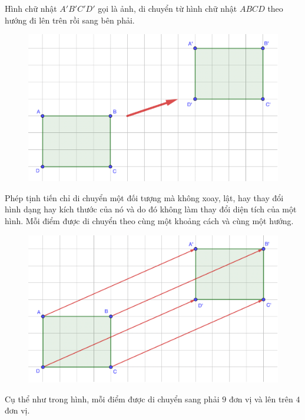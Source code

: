 \begin{multicols}{2}
	\vskip 0.1cm  
	Hình chữ nhật $A'B'C'D'$ gọi là ảnh, di chuyển từ hình chữ nhật $ABCD$ theo hướng đi lên trên rồi sang bên phải. 
	\begin{figure}[H]
		\vspace*{-5pt}
		\centering
		\captionsetup{labelformat= empty, justification=centering}
		\includegraphics[width= 1\linewidth]{Picture30}
		\vspace*{-10pt}
	\end{figure}
	Phép tịnh tiến chỉ di chuyển một đối tượng mà không xoay, lật, hay thay đổi hình dạng hay kích thước của nó và do đó không làm thay đổi diện tích của một hình. Mỗi điểm được di chuyển theo cùng một khoảng cách và cùng một hướng. 
	\begin{figure}[H]
		\vspace*{-5pt}
		\centering
		\captionsetup{labelformat= empty, justification=centering}
		\includegraphics[width= 1\linewidth]{Picture31}
		\vspace*{-15pt}
	\end{figure}
	Cụ thể như trong hình, mỗi điểm được di chuyển sang phải $9$ đơn vị và lên trên $4$ đơn vị. 

\end{multicols}
